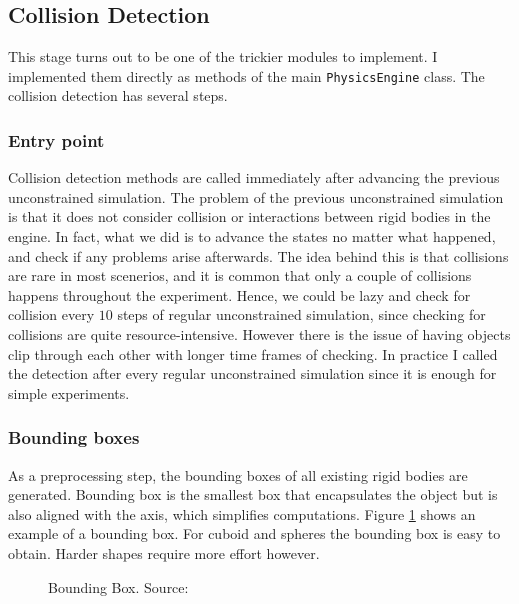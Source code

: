 \documentclass[12pt,a4paper,twoside,openright]{report}
\newcommand{\code}{\texttt}
\begin{document}
\subsection{Collision Detection}

This stage turns out to be one of the trickier modules to implement. I implemented them directly as methods of the main \code{PhysicsEngine} class. The collision detection has several steps.

\subsubsection{Entry point} 
Collision detection methods are called immediately after advancing the previous unconstrained simulation. The problem of the previous unconstrained simulation is that it does not consider collision or interactions between rigid bodies in the engine. In fact, what we did is to advance the states no matter what happened, and check if any problems arise afterwards. The idea behind this is that collisions are rare in most scenerios, and it is common that only a couple of collisions happens throughout the experiment. Hence, we could be lazy and check for collision every $10$ steps of regular unconstrained simulation, since checking for collisions are quite resource-intensive. However there is the issue of having objects clip through each other with longer time frames of checking. In practice I called the detection after every regular unconstrained simulation since it is enough for simple experiments.

\subsubsection{Bounding boxes}
As a preprocessing step, the bounding boxes of all existing rigid bodies are generated. Bounding box is the smallest box that encapsulates the object but is also aligned with the axis, which simplifies computations. Figure \ref{bboxfig} shows an example of a bounding box. For cuboid and spheres the bounding box is easy to obtain. Harder shapes require more effort however\cite{o1985finding}.

\begin{figure}
\label{bboxfig}
\begin{center}
  \end{center}
    \caption{Bounding Box. Source: \cite{bbox}}
\end{figure}
\end{document}
